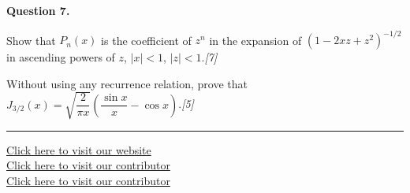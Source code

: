 \documentclass[11pt,a4paper]{article}
\newcommand{\pts}[1]{\hfill   \textit{[#1]}}
\begin{document}
\medskip


\noindent   \textbf{Question 7.}

\begin{parts}
  \item Show that $P_n(x)$ is the coefficient of $z^n$ in the expansion of $(1-2xz+z^2)^{-1/2}$ in ascending powers of $z$, $|x|<1$, $|z|<1$.\pts{7}
  \item Without using any recurrence relation, prove that $J_{3/2}(x)=\sqrt{\dfrac{2}{\pi x}}\!\left(\dfrac{\sin x}{x}-\cos x\right)$.\pts{5}
\end{parts}

\vfill\rule{\linewidth}{0.4pt}

\begin{center}\small
\href{https://bhu-exam.vercel.app/}{Click here to visit our website}\\[4pt]
\href{https://me-aryan.vercel.app/}{Click here to visit our contributor}\\[4pt]
\href{https://quashan-me.vercel.app/}{Click here to visit our contributor}
\end{center}
\end{document}
